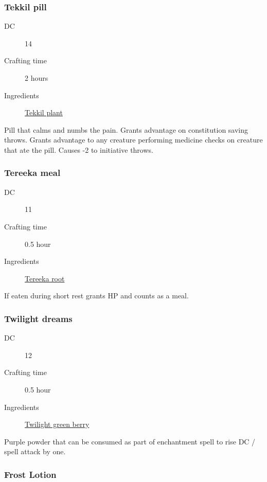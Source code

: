 \subsubsection{Tekkil pill}
\label{Tekkil pill}

\begin{description}
\item [DC] 14
\item [Crafting time] 2 hours
\item [Ingredients] \hyperref[Tekkil]{Tekkil plant}
\end{description}

Pill that calms and numbs the pain. Grants advantage on constitution saving throws. 
Grants advantage to any creature performing medicine checks on creature that ate the pill. 
Causes -2 to initiative throws.

\subsubsection{Tereeka meal}
\label{Tereeka meal}

\begin{description}
\item [DC] 11
\item [Crafting time] 0.5 hour
\item [Ingredients] \hyperref[Tereeka Root]{Tereeka root}
\end{description}

If eaten during short rest grants  HP and counts as a meal.

\subsubsection{Twilight dreams}
\label{Twilight dreams}

\begin{description}
\item [DC] 12
\item [Crafting time] 0.5 hour
\item [Ingredients] \hyperref[Twilight Green]{Twilight green berry}
\end{description}

Purple powder that can be consumed as part of enchantment spell to rise DC / spell attack by one.

\subsubsection{Frost Lotion}
\label{Frost Lotion}

